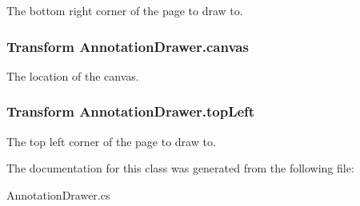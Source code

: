 The bottom right corner of the page to draw to. 

\subsubsection[{canvas}]{\setlength{\rightskip}{0pt plus 5cm}Transform Annotation\+Drawer.\+canvas}\label{class_annotation_drawer_a82fe9da03536f06847e78186e0c175a1}


The location of the canvas. 

\subsubsection[{top\+Left}]{\setlength{\rightskip}{0pt plus 5cm}Transform Annotation\+Drawer.\+top\+Left}\label{class_annotation_drawer_a932f3cf8744289386ec6950d41638f30}


The top left corner of the page to draw to. 



The documentation for this class was generated from the following file\+:\begin{DoxyCompactItemize}
\item 
Annotation\+Drawer.\+cs\end{DoxyCompactItemize}
